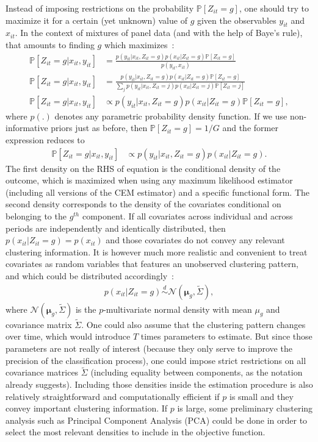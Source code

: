 \documentclass[11pt,letter]{article}
\begin{document}
\par
Instead of imposing restrictions on the probability $\mathbb{P}[Z_{it}=g]$, one should try to maximize it for a certain (yet unknown) value of $g$ given the observables $y_{it}$ and $x_{it}$. In the context of mixtures of panel data (and with the help of Baye's rule), that amounts to finding $g$ which maximizes~:
\begin{align*}
\mathbb{P}[Z_{it}=g|x_{it},y_{it}] &= \frac{ p(y_{it}|x_{it},Z_{it}=g)p(x_{it}|Z_{it}=g)\mathbb{P}[Z_{it}=g]}{p(y_{it},x_{it})} \nonumber \\
\mathbb{P}[Z_{it}=g|x_{it},y_{it}] &= \frac{p(y_{it}|x_{it},Z_{it}=g)p(x_{it}|Z_{it}=g)\mathbb{P}[Z_{it}=g]}{\sum_jp(y_{it}|x_{it},Z_{it}=j)p(x_{it}|Z_{it}=j)\mathbb{P}[Z_{it}=j]} \nonumber \\
\mathbb{P}[Z_{it}=g|x_{it},y_{it}] &\propto p(y_{it}|x_{it},Z_{it}=g)p(x_{it}|Z_{it}=g)\mathbb{P}[Z_{it}=g],
\end{align*}
where $p(.)$ denotes any parametric probability density function. If we use non-informative priors just as before, then $\mathbb{P}[Z_{it}=g] = 1/G$ and the former expression reduces to
\begin{align}\label{eqn:18}
\mathbb{P}[Z_{it}=g|x_{it},y_{it}] &\propto p(y_{it}|x_{it},Z_{it}=g)p(x_{it}|Z_{it}=g).
\end{align}
The first density on the RHS of equation is the conditional density of the outcome, which is maximized when using any maximum likelihood estimator (including all versions of the CEM estimator) and a specific functional form. The second density corresponds to the density of the covariates conditional on belonging to the $g^{th}$ component. If all covariates across individual and across periods are independently and identically distributed, then $p(x_{it}|Z_{it}=g) = p(x_{it})$ and those covariates do not convey any relevant clustering information. It is however much more realistic and convenient to treat covariates as random variables that features an unobserved clustering pattern, and which could be distributed accordingly~:
\begin{align*}
p(x_{it}|Z_{it}=g) \overset{d}\sim \mathcal{N}(\mathbf{\mu}_{g},\tilde{\Sigma}),
\end{align*}
where $\mathcal{N}(\mathbf{\mu}_{g},\tilde{\Sigma})$ is the $p$-multivariate normal density with mean $\mu_g$ and covariance matrix $\tilde{\Sigma}$. One could also assume that the clustering pattern changes over time, which would introduce $T$ times parameters to estimate. But since those parameters are not really of interest (because they only serve to improve the precision of the classification process), one could impose strict restrictions on all covariance matrices $\tilde{\Sigma}$ (including equality between components, as the notation already suggests). Including those densities inside the estimation procedure is also relatively straightforward and computationally efficient if $p$ is small and they convey important clustering information. If $p$ is large, some preliminary clustering analysis such as Principal Component Analysis (PCA) could be done in order to select the most relevant densities to include in the objective function.
\end{document}
